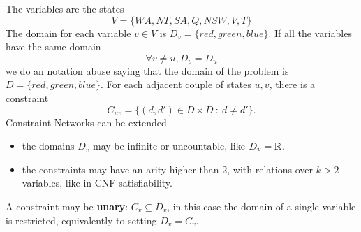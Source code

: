 \documentclass[10pt, letterpaper]{report}
\begin{document}
The variables are the states 
$$ V=\{WA,NT,SA,Q,NSW,V,T\}$$
The domain for each variable $v\in V$ is $D_v=\{red,green,blue\}$.
If all the variables have the same domain \begin{equation}
    \forall v\ne u, D_v=D_u
\end{equation}
we do an notation abuse saying that the domain of the problem is $D=\{red,green,blue\}$.
For each adjacent couple of states $u,v$, there is a constraint
$$C_{uv}=\{(d,d')\in D\times D \ : \ d\ne d'\}.$$
Constraint Networks can be extended\begin{itemize}
    \item the domains $D_v$ may be infinite or uncountable, like $D_v={\mathbb R}$.
    \item the constraints may have an arity higher than 2, with relations over $k>2$ variables, like in CNF satisfiability.
\end{itemize}
A constraint may be \textbf{unary}: $C_v\subseteq D_v$, in this case the domain of a single variable is restricted, equivalently to setting $D_v=C_v$.\bigskip 
\end{document}
